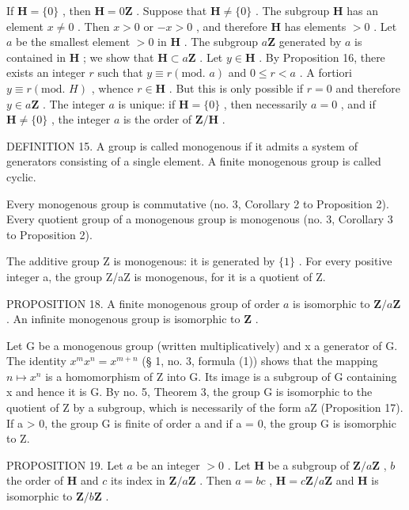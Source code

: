 If \(\mathbf{H} = \{0\}\) , then \(\mathbf{H} = 0\mathbf{Z}\) . Suppose that \(\mathbf{H} \neq \{0\}\) . The subgroup \(\mathbf{H}\) has an element \(x \neq 0\) . Then \(x > 0\) or \(-x > 0\) , and therefore \(\mathbf{H}\) has elements \(>0\) . Let \(a\) be the smallest element \(>0\) in \(\mathbf{H}\) . The subgroup \(a\mathbf{Z}\) generated by \(a\) is contained in \(\mathbf{H}\) ; we show that \(\mathbf{H} \subset a\mathbf{Z}\) . Let \(y \in \mathbf{H}\) . By Proposition 16, there exists an integer \(r\) such that \(y \equiv r (\text{mod. } a)\) and \(0 \leqslant r < a\) . A fortiori \(y \equiv r (\text{mod. } H)\) , whence \(r \in \mathbf{H}\) . But this is only possible if \(r = 0\) and therefore \(y \in a\mathbf{Z}\) . The integer \(a\) is unique: if \(\mathbf{H} = \{0\}\) , then necessarily \(a = 0\) , and if \(\mathbf{H} \neq \{0\}\) , the integer \(a\) is the order of \(\mathbf{Z}/\mathbf{H}\) .

DEFINITION 15. A group is called monogenous if it admits a system of generators consisting of a single element. A finite monogenous group is called cyclic.

Every monogenous group is commutative (no. 3, Corollary 2 to Proposition 2). Every quotient group of a monogenous group is monogenous (no. 3, Corollary 3 to Proposition 2).

The additive group Z is monogenous: it is generated by \(\{1\}\) . For every positive integer a, the group Z/aZ is monogenous, for it is a quotient of Z.

PROPOSITION 18. A finite monogenous group of order \(a\) is isomorphic to \(\mathbf{Z}/a\mathbf{Z}\) . An infinite monogenous group is isomorphic to \(\mathbf{Z}\) .

Let G be a monogenous group (written multiplicatively) and x a generator of G. The identity \(x^{m}x^{n} = x^{m+n}\) (§ 1, no. 3, formula (1)) shows that the mapping \(n \mapsto x^{n}\) is a homomorphism of Z into G. Its image is a subgroup of G containing x and hence it is G. By no. 5, Theorem 3, the group G is isomorphic to the quotient of Z by a subgroup, which is necessarily of the form aZ (Proposition 17). If a \textgreater{} 0, the group G is finite of order a and if a = 0, the group G is isomorphic to Z.

PROPOSITION 19. Let \(a\) be an integer \(>0\) . Let \(\mathbf{H}\) be a subgroup of \(\mathbf{Z}/a\mathbf{Z}\) , \(b\) the order of \(\mathbf{H}\) and \(c\) its index in \(\mathbf{Z}/a\mathbf{Z}\) . Then \(a = bc\) , \(\mathbf{H} = c\mathbf{Z}/a\mathbf{Z}\) and \(\mathbf{H}\) is isomorphic to \(\mathbf{Z}/b\mathbf{Z}\) .

